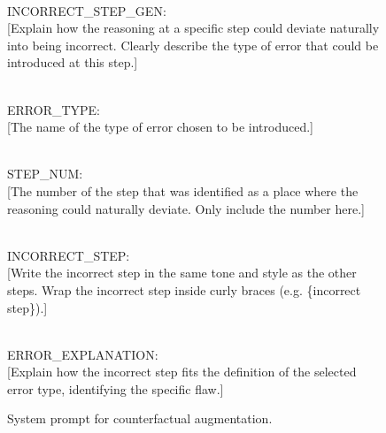 \begin{figure}[ht]
\begin{minipage}{6in}
\begin{tcolorbox}[width=6in, sharp corners=all, colback=white!95!black]
\-\\
INCORRECT\_STEP\_GEN:\\
\textrm{[Explain how the reasoning at a specific step could deviate naturally into being incorrect. Clearly describe the type of error that could be introduced at this step.]}

\-\\
ERROR\_TYPE:\\
\textrm{[The name of the type of error chosen to be introduced.]}

\-\\
STEP\_NUM:\\
\textrm{[The number of the step that was identified as a place where the reasoning could naturally deviate. Only include the number here.]}

\-\\
INCORRECT\_STEP:\\
\textrm{[Write the incorrect step in the same tone and style as the other steps. Wrap the incorrect step inside curly braces (e.g. \{incorrect step\}).]}

\-\\
ERROR\_EXPLANATION:\\
\textrm{[}Explain how the incorrect step fits the definition of the selected error type, identifying the specific flaw.\textrm{]}
\end{tcolorbox}
    \end{minipage}
    \caption{System prompt for counterfactual augmentation.}
    \label{fig:neg-augmentation-system-prompt}
\end{figure}




\clearpage